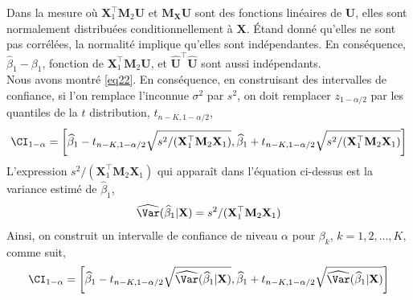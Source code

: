 Dans la mesure où $\mathbf{X}_1^\top\mathbf{M}_2\mathbf{U}$ et $\mathbf{M}_\mathbf{X}\mathbf{U}$ sont des fonctions linéaires de $\mathbf{U}$, elles sont normalement distribuées conditionnellement à $\mathbf{X}$. \'Etand donné qu'elles ne sont pas corrélées, la normalité implique qu'elles sont indépendantes. En conséquence, $\widehat{\beta}_1 - \beta_1$, fonction de  $\mathbf{X}_1^\top\mathbf{M}_2\mathbf{U}$, et $\widehat{\mathbf{U}}^\top\widehat{\mathbf{U}}$ sont aussi indépendants.\\
Nous avons montré \eqref{eq22}. En conséquence, en construisant des intervalles de confiance, si l'on remplace l'inconnue $\sigma^2$ par $s^2$, on doit remplacer $z_{1-\alpha/2}$ par les quantiles de la $t$ distribution, $t_{n-K, 1-\alpha/2}$,
\begin{align*}
\CI_{1-\alpha} = \left[\widehat{\beta}_1 - t_{n-K, 1-\alpha/2}\sqrt{s^2/(\mathbf{X}_1^\top\mathbf{M}_2\mathbf{X}_1)}, 
\widehat{\beta}_1 + t_{n-K, 1-\alpha/2}\sqrt{s^2/(\mathbf{X}_1^\top\mathbf{M}_2\mathbf{X}_1)}\right]
\end{align*}
L'expression $s^2/(\mathbf{X}_1^\top\mathbf{M}_2\mathbf{X}_1)$ qui apparaît dans l'équation ci-dessus est la variance estimé de $\widehat{\beta}_1$,
\begin{align*}
\widehat{\Var}(\widehat{\beta}_1| \mathbf{X}) = s^2/(\mathbf{X}_1^\top\mathbf{M}_2\mathbf{X}_1)
\end{align*}
Ainsi, on construit un intervalle de confiance de niveau $\alpha$ pour $\beta_k$, $k=1, 2,...,K$, comme suit,
\begin{align}
\CI_{1-\alpha} = \left[\widehat{\beta}_1 - t_{n-K, 1-\alpha/2}\sqrt{\widehat{\Var}(\widehat{\beta}_1| \mathbf{X})}, 
\widehat{\beta}_1 + t_{n-K, 1-\alpha/2}\sqrt{\widehat{\Var}(\widehat{\beta}_1| \mathbf{X})}\right]
\label{eq27}
\end{align}

